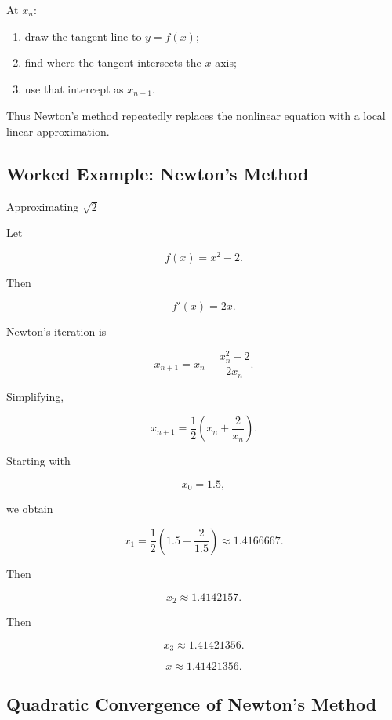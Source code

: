 At \(x_n\):

\begin{enumerate}
    \item draw the tangent line to \(y=f(x)\);
    \item find where the tangent intersects the \(x\)-axis;
    \item use that intercept as \(x_{n+1}\).
\end{enumerate}

Thus Newton's method repeatedly replaces the nonlinear equation with a
local linear approximation.

\subsection{Worked Example: Newton's Method}
\label{subsec:worked-newton}

\begin{workedexamplebox}{Approximating \(\sqrt{2}\)}

Let

\[
f(x)=x^2-2.
\]

Then

\[
f'(x)=2x.
\]

Newton's iteration is

\[
x_{n+1}
=
x_n
-
\frac{
x_n^2-2
}{
2x_n
}.
\]

Simplifying,

\[
\boxed{
x_{n+1}
=
\frac12
\left(
x_n+\frac{2}{x_n}
\right).
}
\]

Starting with

\[
x_0=1.5,
\]

we obtain

\[
x_1
=
\frac12
\left(
1.5+\frac{2}{1.5}
\right)
\approx1.4166667.
\]

Then

\[
x_2
\approx1.4142157.
\]

Then

\[
x_3
\approx1.41421356.
\]

\begin{answerbox}
\[
\boxed{
x\approx1.41421356.
}
\]
\end{answerbox}

\end{workedexamplebox}

\subsection{Quadratic Convergence of Newton's Method}
\label{subsec:newton-quadratic-convergence}

